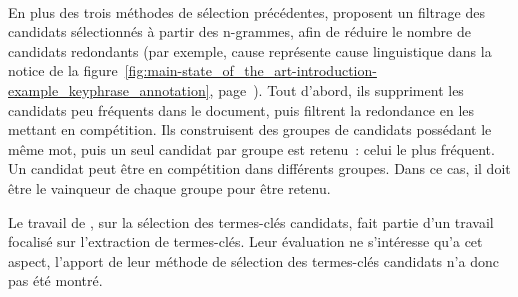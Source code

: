     ~\\En plus des trois méthodes de sélection précédentes,
     proposent un filtrage
    des candidats sélectionnés à partir des n-grammes, afin de réduire le nombre
    de candidats redondants (par exemple, \og{}cause\fg{} représente \og{}cause
    linguistique\fg{} dans la notice de la
    figure~\ref{fig:main-state_of_the_art-introduction-example_keyphrase_annotation},
    page~\pageref{fig:main-state_of_the_art-introduction-example_keyphrase_annotation}).
    Tout d'abord, ils suppriment les candidats peu fréquents dans le document,
    puis filtrent la redondance en les mettant en compétition. Ils construisent
    des groupes de candidats possédant le même mot, puis un seul candidat par groupe est
    retenu~: celui le plus fréquent. Un candidat peut être en compétition dans
    différents groupes. Dans ce cas, il doit être le \og{}vainqueur\fg{} de
    chaque groupe pour être retenu.

    Le travail de , sur la
    sélection des termes-clés candidats, fait partie d'un travail focalisé sur
    l'extraction de termes-clés. Leur évaluation ne s'intéresse qu'a cet aspect,
    l'apport de leur méthode de sélection des termes-clés candidats n'a donc pas
    été montré.



